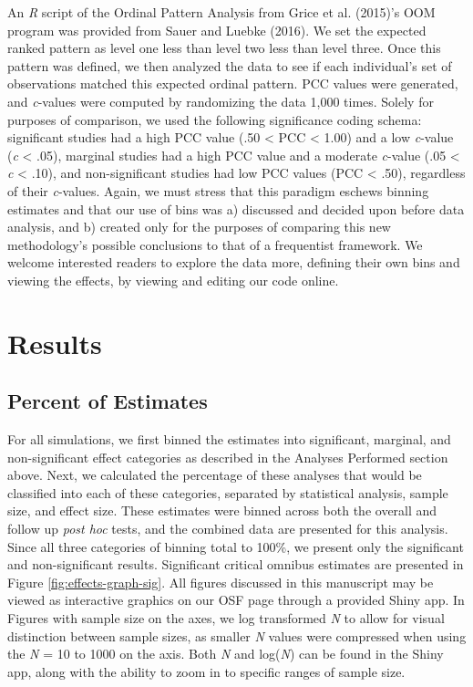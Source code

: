\documentclass[,man, mask]{apa6}
\begin{document}
An \emph{R} script of the Ordinal Pattern Analysis from Grice et al. (2015)'s OOM program was provided from Sauer and Luebke (2016). We set the expected ranked pattern as level one less than level two less than level three. Once this pattern was defined, we then analyzed the data to see if each individual's set of observations matched this expected ordinal pattern. PCC values were generated, and \emph{c}-values were computed by randomizing the data 1,000 times. Solely for purposes of comparison, we used the following significance coding schema: significant studies had a high PCC value (.50 \textless{} PCC \textless{} 1.00) and a low \emph{c}-value (\emph{c} \textless{} .05), marginal studies had a high PCC value and a moderate \emph{c}-value (.05 \textless{} \emph{c} \textless{} .10), and non-significant studies had low PCC values (PCC \textless{} .50), regardless of their \emph{c}-values. Again, we must stress that this paradigm eschews binning estimates and that our use of bins was a) discussed and decided upon before data analysis, and b) created only for the purposes of comparing this new methodology's possible conclusions to that of a frequentist framework. We welcome interested readers to explore the data more, defining their own bins and viewing the effects, by viewing and editing our code online.

\hypertarget{results}{%
\section{Results}\label{results}}

\hypertarget{percent-of-estimates}{%
\subsection{Percent of Estimates}\label{percent-of-estimates}}

For all simulations, we first binned the estimates into significant, marginal, and non-significant effect categories as described in the Analyses Performed section above. Next, we calculated the percentage of these analyses that would be classified into each of these categories, separated by statistical analysis, sample size, and effect size. These estimates were binned across both the overall and follow up \emph{post hoc} tests, and the combined data are presented for this analysis. Since all three categories of binning total to 100\%, we present only the significant and non-significant results. Significant critical omnibus estimates are presented in Figure \ref{fig:effects-graph-sig}. All figures discussed in this manuscript may be viewed as interactive graphics on our OSF page through a provided Shiny app. In Figures with sample size on the axes, we log transformed \emph{N} to allow for visual distinction between sample sizes, as smaller \emph{N} values were compressed when using the \emph{N} = 10 to 1000 on the axis. Both \emph{N} and log(\emph{N}) can be found in the Shiny app, along with the ability to zoom in to specific ranges of sample size.
\end{document}
